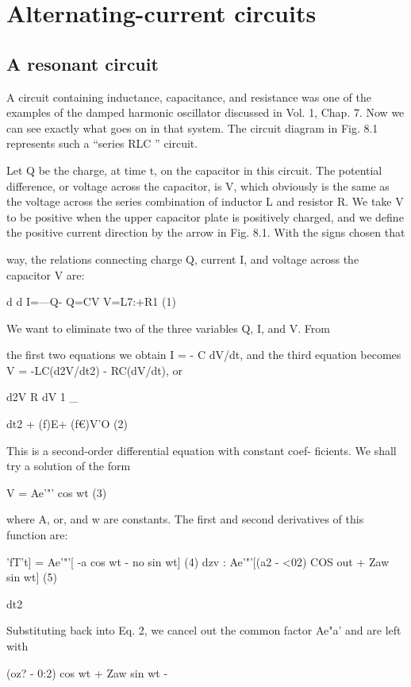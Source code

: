 \chapter{Alternating-current circuits}

\iffalse

\section{A resonant circuit}

A circuit containing inductance, capacitance, and resistance was
one of the examples of the damped harmonic oscillator discussed in
Vol. 1, Chap. 7. Now we can see exactly what goes on in that system.
The circuit diagram in Fig. 8.1 represents such a ``series RLC '' circuit.

Let Q be the charge, at time t, on the capacitor in this circuit. The
potential difference, or voltage across the capacitor, is V, which
obviously is the same as the voltage across the series combination
of inductor L and resistor R. We take V to be positive when the upper
capacitor plate is positively charged, and we define the positive current
direction by the arrow in Fig. 8.1. With the signs chosen that

way, the relations connecting charge Q, current I, and voltage across
the capacitor V are:

d d
I=---Q- Q=CV V=L7:+R1 (1)

We want to eliminate two of the three variables Q, I, and V. From

 

the first two equations we obtain I = - C dV/dt, and the third equation
becomes V = -LC(d2V/dt2) - RC(dV/dt), or

d2V R dV 1 _

dt2 + (f)E+ (f€)V'O (2)

This is a second-order differential equation with constant coef-
ficients. We shall try a solution of the form

V = Ae'"' cos wt (3)

where A, or, and w are constants. The first and second derivatives of
this function are:

'fT't] = Ae'"'[ -a cos wt - no sin wt] (4)
dzv : Ae'"'[(a2 - <02) COS out + Zaw sin wt] (5)

dt2

Substituting back into Eq. 2, we cancel out the common factor Ae"a'
and are left with

(oz? - 0:2) cos wt + Zaw sin wt - %

